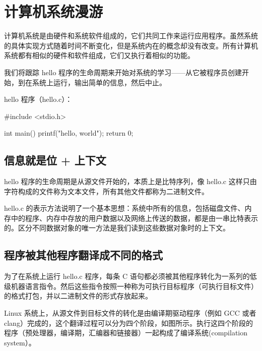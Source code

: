 \chapter{计算机系统漫游}

计算机系统是由硬件和系统软件组成的，它们共同工作来运行应用程序。虽然系统的具体实现方式随着时间不断变化，但是系统内在的概念却没有改变。所有计算机系统都有相似的硬件和软件组成，它们又执行着相似的功能。

我们将跟踪 hello 程序的生命周期来开始对系统的学习——从它被程序员创建开始，到在系统上运行，输出简单的信息，然后中止。

hello 程序（hello.c）：
\begin{cppcode}
#include <stdio.h>

int main() {
  printf("hello, world\n");
  return 0;
}
\end{cppcode}

\section{信息就是位 + 上下文}

hello 程序的生命周期是从源文件开始的，本质上是比特序列，像 hello.c 这样只由字符构成的文件称为文本文件，所有其他文件都称为二进制文件。

hello.c 的表示方法说明了一个基本思想：系统中所有的信息，包括磁盘文件、内存中的程序、内存中存放的用户数据以及网络上传送的数据，都是由一串比特表示的。区分不同数据对象的唯一方法是我们读到这些数据对象时的上下文。

\section{程序被其他程序翻译成不同的格式}

为了在系统上运行 hello.c 程序，每条 C 语句都必须被其他程序转化为一系列的低级机器语言指令。然后这些指令按照一种称为可执行目标程序（可执行目标文件）的格式打包，并以二进制文件的形式存放起来。

Linux 系统上，从源文件到目标文件的转化是由编译期驱动程序（例如 GCC 或者 clang）完成的，这个翻译过程可以分为四个阶段，如图所示。执行这四个阶段的程序（预处理器，编译期，汇编器和链接器）一起构成了编译系统(compilation system）。

